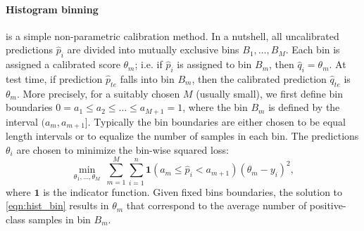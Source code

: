 \paragraph{Histogram binning} \cite{zadrozny2001obtaining} is a simple non-parametric calibration method.
In a nutshell,  all uncalibrated predictions $\hat{p}_i$ are divided
into mutually exclusive bins $B_1,\dots,B_M$. Each bin is assigned a calibrated score $\theta_m$; i.e. if $\hat p_i$ is assigned to bin $B_m$, then $\hat q_i = \theta_m$. At test time, if prediction $\hat{p}_{te}$ falls into bin $B_m$, then the calibrated prediction $\hat q_{te}$ is $\theta_m$.
%
More precisely, for a suitably chosen $M$ (usually small), we first define bin boundaries $0 = a_1 \leq a_2 \leq \ldots \leq a_{M+1} = 1$, where the bin $B_m$ is defined by the interval $(a_m, a_{m+1}]$.
Typically the bin boundaries are either chosen to be equal length intervals
or to equalize the number of samples in each bin.
The predictions $\theta_i$ are chosen to minimize the bin-wise squared loss:
\begin{equation}
\min_{\theta_1,\ldots,\theta_M} \: \sum_{m=1}^M \sum_{i = 1}^n
\mathbf{1} (a_m \leq \hat p_i < a_{m+1}) \left(\theta_m - y_i \right)^2,
\label{eqn:hist_bin}
\end{equation}
%
where $\mathbf{1}$ is the indicator function. Given fixed bins boundaries, the solution to \eqref{eqn:hist_bin} results in $\theta_m$ that correspond to the average number of positive-class samples in bin $B_m$.

